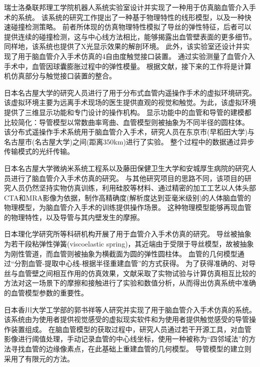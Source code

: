瑞士洛桑联邦理工学院机器人系统实验室设计并实现了一种用于仿真脑血管介入手术的系统\cite{Wang2007EPFL}\cite{Ilic2005EPFL}\cite{Moix2005EPFL}\cite{Ilic2005aEPFL}\cite{Ilic2005bEPFL}。
该系统的研究工作提出了一种基于物理特性的线形模型，以及一种快速碰撞检测策略\cite{Wang2007EPFL}。
前者所体现的仿真物理特性模拟了导丝的弹性特征，后者可以提供连续的碰撞检测，这与中心线方法相比，能够揭露出血管壁表面的更多细节。
同样地，该系统也提供了X光显示效果的解剖环境。
此外，该实验室还设计并实现了用于脑血管介入手术仿真的4自由度触觉接口装置\cite{Ilic2005EPFL}\cite{Moix2005EPFL}\cite{Ilic2005aEPFL}。
通过实验测量了血管介入手术中，血管因球囊膨胀过程中的弹性模量\cite{Ilic2005bEPFL}。
根据文献\cite{Wang2007EPFL}，接下来的工作将是计算机仿真部分与触觉接口装置的整合。

日本名古屋大学的研究人员进行了用于分布式血管内遥操作手术的虚拟环境研究\cite{Arai1994Nagoya}\cite{Arai1995Nagoya}\cite{Arai1996Nagoya}。
该虚拟环境主要为远离手术现场的医生提供直观的视觉和触觉。为此，该虚拟环境提供了三维显示功能和专门设计的操作机构。
显示功能中的血管和导管的建模都比较简化：导管模型以常数曲率弯曲、血管模型则被抽象为不同半径的圆柱体\cite{Arai1994Nagoya}\cite{Arai1995Nagoya}。
该分布式遥操作手术系统用于脑血管介入手术，研究人员在东京市(早稻田大学)与名古屋市(名古屋大学)之间(距离350km)进行了实验。
整个过程中的数据通过异步传输模式的光纤传输\cite{Arai1996Nagoya}。

日本名古屋大学微纳米系统工程系以及藤田保健卫生大学和安城厚生病院的研究人员进行了脑血管介入手术仿真的研究\cite{Ikeda2004Nagoya}\cite{Ikeda2005Nagoya}\cite{Ikeda2005aNagoya}\cite{Ikeda2006Nagoya}\cite{Ikeda2007Nagoya}。
与其他研究项目的思路不同，该项目的研究人员仍然坚持实物仿真训练，利用硅胶等材料、通过精密的加工工艺以人体头部CTA和MRA影像为依据，制作高精确度(解析度达到亚毫米级别)的人体脑血管的物理模型，为脑血管介入手术的训练提供操作场景\cite{Ikeda2005Nagoya}。
这种物理模型能够再现血管的物理特性，以及导管与其内壁发生的摩擦。

日本理化学研究所等科研机构开展了用于血管介入手术仿真的研究\cite{takashima2009RIKEN}\cite{takashima2007RIKEN}。
导丝被抽象为若干段粘弹性弹簧(viscoelastic spring)，其近端由于受限于导丝模型，故被抽象为刚性管道，而血管则被抽象为横截面为圆的弹性圆柱体\cite{takashima2009RIKEN}。
血管的几何模型通过“分割血管-提取中心线-根据半径重建血管”的方式获得\cite{takashima2009RIKEN}。
为了获得准确的、对导丝与血管壁之间相互作用的仿真效果，文献\cite{takashima2007RIKEN}采取了实物试验与计算仿真相互比较的方法对这一场景下的摩擦和接触进行了实验和数值分析，从而得出仿真系统中准确的血管模型参数的重要性。

日本香川大学工学部的郭书祥等人研究并实现了用于脑血管介入手术仿真的系统\cite{Gao2012aGUO}\cite{Gao2012bGUO}\cite{Gao2012cGUO}。
该系统由为使用者提供视觉感受的虚拟现实软件和为使用者提供触觉感受的导管操作装置组成\cite{Gao2012aGUO}。
在脑血管模型的获取过程中，研究人员通过若干开源工具，对血管影像进行阈值处理，手动记录血管的中心线坐标，使用一种被称为“四邻域法”的方法寻找血管的边缘像素点，在此基础上重建血管的几何模型\cite{Gao2012bGUO}。
导管模型的建立则采用了有限元的方法\cite{Gao2012cGUO}。

